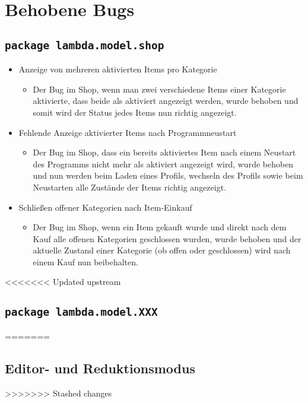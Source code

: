 \section{Behobene Bugs}
\subsection{\texttt{package lambda.model.shop}}
\begin{itemize}
\item Anzeige von mehreren aktivierten Items pro Kategorie
\begin{itemize} 
\item Der Bug im Shop, wenn man zwei verschiedene Items einer Kategorie aktivierte, dass beide als aktiviert angezeigt werden, wurde behoben
	und somit wird der Status jedes Items nun richtig angezeigt.
	\end{itemize}
\end{itemize}

\begin{itemize}
\item Fehlende Anzeige aktivierter Items nach Programmneustart
\begin{itemize} 
\item Der Bug im Shop, dass ein bereits aktiviertes Item nach einem Neustart des Programms nicht mehr als aktiviert angezeigt wird, wurde behoben
	und nun werden beim Laden eines Profils, wechseln des Profils sowie beim Neustarten alle Zustände der Items richtig angezeigt.
	\end{itemize}
\end{itemize}

\begin{itemize}
\item Schließen offener Kategorien nach Item-Einkauf
\begin{itemize} 
\item Der Bug im Shop, wenn ein Item gekauft wurde und direkt nach dem Kauf alle offenen Kategorien geschlossen wurden, wurde behoben und
	der aktuelle Zustand einer Kategorie (ob offen oder geschlossen) wird nach einem Kauf nun beibehalten.
	\end{itemize}
\end{itemize}

<<<<<<< Updated upstream
\subsection{\texttt{package lambda.model.XXX}}
=======
\subsection{Editor- und Reduktionsmodus}
>>>>>>> Stashed changes

